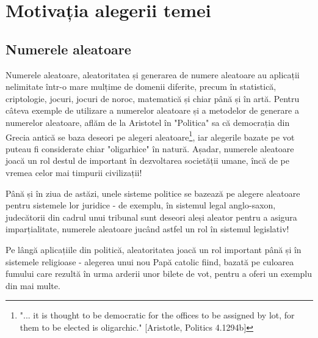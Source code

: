 \iffalse
Introducerea va avea 2–3 pagini care vor conține motivația alegerii temei, relevanța și contextul temei alese, obiectivele generale ale lucrării, metodologia și instrumentele utilizate și o scurtă descriere a structurii lucrării (titlul capitolelor, o scurtă descriere și legătura dintre acestea).

În acest capitol nu se introduc figuri, table sau listing-uri de cod. Pot fi în schimb referite!
\fi
\renewcommand{\thesection}{\Roman{section}}
\renewcommand{\thesubsection}{\thesection.\Roman{subsection}}
\section{Motivația alegerii temei}
\subsection{Numerele aleatoare}
Numerele aleatoare, aleatoritatea și generarea de numere aleatoare au aplicații nelimitate într-o mare mulțime de domenii diferite, precum în statistică, criptologie, jocuri, jocuri de noroc, matematică și chiar până și în artă.
Pentru câteva exemple de utilizare a numerelor aleatoare și a metodelor de generare a numerelor aleatoare, aflăm de la Aristotel în "Politica" sa \cite{book:aristotle:2015} că democrația din Grecia antică se baza deseori pe alegeri aleatoare\footnote{"... it is thought to be democratic for the offices to be assigned by lot, for them to be elected is oligarchic." [Aristotle, Politics 4.1294b]}, iar alegerile bazate pe vot puteau fi considerate chiar "oligarhice" în natură. Așadar, numerele aleatoare joacă un rol destul de important în dezvoltarea societății umane, încă de pe vremea celor mai timpurii civilizații!

Până și în ziua de astăzi, unele sisteme politice se bazează pe alegere aleatoare pentru sistemele lor juridice - de exemplu, în sistemul legal anglo-saxon, judecătorii din cadrul unui tribunal sunt deseori aleși aleator pentru a asigura imparțialitate, numerele aleatoare jucând astfel un rol în sistemul legislativ!

Pe lângă aplicațiile din politică, aleatoritatea joacă un rol important până și în sistemele religioase - alegerea unui nou Papă catolic fiind, bazată pe culoarea fumului care rezultă în urma arderii unor bilete de vot, pentru a oferi un exemplu din mai multe.

